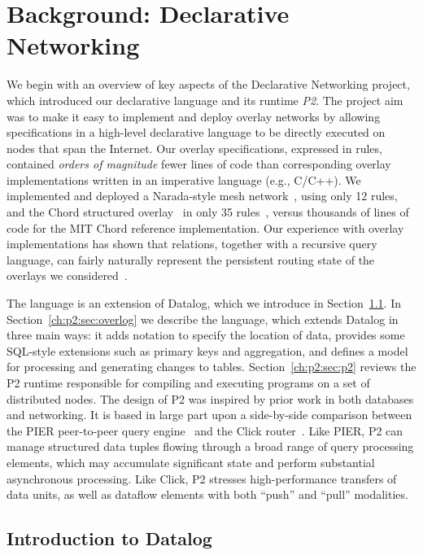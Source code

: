 \chapter[Background: Declarative Networking]{Background: Declarative Networking}
\label{ch:p2}

We begin with an overview of key aspects of the Declarative Networking project, which introduced our declarative language 
{\em \OVERLOG} and its runtime {\em P2}. The project aim was to make it easy to implement and deploy overlay networks 
by allowing specifications in a high-level declarative language to be directly executed on nodes that span the Internet. 
Our overlay specifications, expressed in \OVERLOG rules, contained {\em orders of magnitude} fewer lines of code than 
corresponding overlay implementations written in an imperative language (e.g., C/C++). We implemented and deployed 
a Narada-style mesh network~\cite{chu00case}, using only 12 rules, and the Chord structured overlay~\cite{chord} 
in only 35 rules~\cite{p2:sosp}, versus thousands of lines of code for the MIT Chord reference implementation. 
Our experience with overlay implementations has shown that relations, together with a recursive query language, 
can fairly naturally represent the persistent routing state of the overlays we considered~\cite{loo-sigmod06, p2:sosp}.

The \OVERLOG language is an extension of Datalog, which we introduce in Section~\ref{ch:p2:sec:datalog}.
In Section~\ref{ch:p2:sec:overlog} we describe the \OVERLOG language, which extends Datalog in three main ways: 
it adds notation to specify the location of data, provides some SQL-style extensions such as primary keys and 
aggregation, and defines a model for processing and generating changes to tables. 
Section~\ref{ch:p2:sec:p2} reviews the P2 runtime responsible for compiling and executing \OVERLOG 
programs on a set of distributed nodes. The design of P2 was inspired by prior work in both databases and 
networking. It is based in large part upon a side-by-side comparison between the PIER peer-to-peer query 
engine~\cite{pier-cidr05} and the Click router~\cite{click-tocs}. Like PIER, P2 can manage structured data 
tuples flowing through a broad range of query processing elements, which may accumulate significant state 
and perform substantial asynchronous processing.  Like Click, P2 stresses high-performance transfers of data units, 
as well as dataflow elements with both ``push'' and ``pull'' modalities. 

\section{Introduction to Datalog}
\label{ch:p2:sec:datalog}

